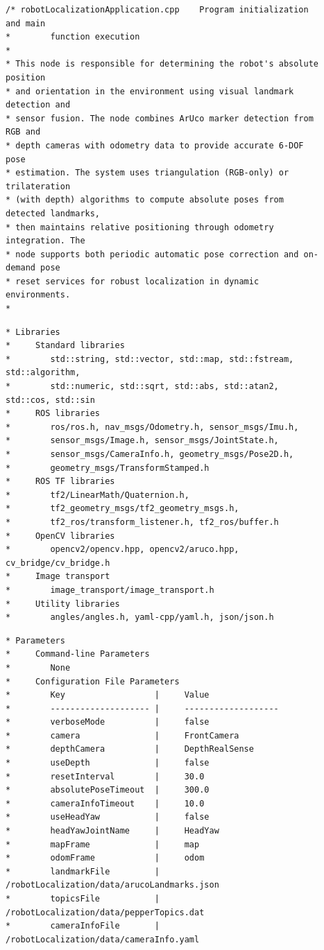 \documentclass{CSSRforAfrica}
\newcommand{\checkboxChecked}{\fbox{\ding{51}}} %
\begin{document}
\begin{description}

\item[\checkboxChecked] 
{\small 
\begin{verbatim}
/* robotLocalizationApplication.cpp    Program initialization and main
*        function execution
*
* This node is responsible for determining the robot's absolute position
* and orientation in the environment using visual landmark detection and
* sensor fusion. The node combines ArUco marker detection from RGB and
* depth cameras with odometry data to provide accurate 6-DOF pose
* estimation. The system uses triangulation (RGB-only) or trilateration
* (with depth) algorithms to compute absolute poses from detected landmarks,
* then maintains relative positioning through odometry integration. The
* node supports both periodic automatic pose correction and on-demand pose
* reset services for robust localization in dynamic environments.
*
\end{verbatim}}

\item[\checkboxChecked] 
{\small 
\begin{verbatim}
* Libraries
*     Standard libraries
*        std::string, std::vector, std::map, std::fstream, std::algorithm,
*        std::numeric, std::sqrt, std::abs, std::atan2, std::cos, std::sin
*     ROS libraries
*        ros/ros.h, nav_msgs/Odometry.h, sensor_msgs/Imu.h,
*        sensor_msgs/Image.h, sensor_msgs/JointState.h,
*        sensor_msgs/CameraInfo.h, geometry_msgs/Pose2D.h,
*        geometry_msgs/TransformStamped.h
*     ROS TF libraries
*        tf2/LinearMath/Quaternion.h,
*        tf2_geometry_msgs/tf2_geometry_msgs.h,
*        tf2_ros/transform_listener.h, tf2_ros/buffer.h
*     OpenCV libraries
*        opencv2/opencv.hpp, opencv2/aruco.hpp, cv_bridge/cv_bridge.h
*     Image transport
*        image_transport/image_transport.h
*     Utility libraries
*        angles/angles.h, yaml-cpp/yaml.h, json/json.h
\end{verbatim}}

\item[\checkboxChecked] 
{\small 
\begin{verbatim}
* Parameters
*     Command-line Parameters
*        None
*     Configuration File Parameters
*        Key                  |     Value 
*        -------------------- |     -------------------
*        verboseMode          |     false
*        camera               |     FrontCamera
*        depthCamera          |     DepthRealSense
*        useDepth             |     false
*        resetInterval        |     30.0
*        absolutePoseTimeout  |     300.0
*        cameraInfoTimeout    |     10.0
*        useHeadYaw           |     false
*        headYawJointName     |     HeadYaw
*        mapFrame             |     map
*        odomFrame            |     odom
*        landmarkFile         |     /robotLocalization/data/arucoLandmarks.json
*        topicsFile           |     /robotLocalization/data/pepperTopics.dat
*        cameraInfoFile       |     /robotLocalization/data/cameraInfo.yaml
\end{verbatim}}


\end{description}
\end{document}
